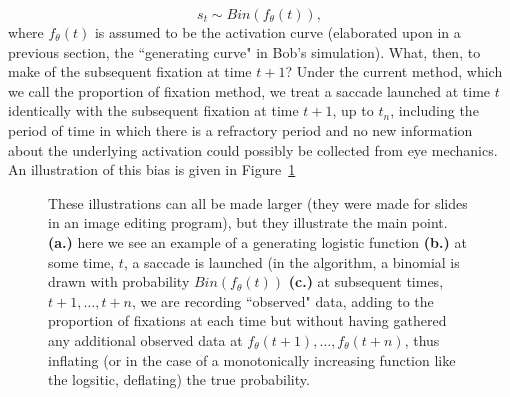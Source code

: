\documentclass{article}
\begin{document}
\begin{equation} \label{eq:saccade_dist}
s_t \sim Bin(f_{\theta}(t)),
\end{equation}
where $f_{\theta}(t)$ is assumed to be the activation curve (elaborated upon in a previous section, the ``generating curve" in Bob's simulation). What, then, to make of the subsequent fixation at time $t+1$? Under the current method, which we call the proportion of fixation method, we treat a saccade launched at time $t$ identically with the subsequent fixation at time $t+1$, up to $t_n$, including the period of time in which there is a refractory period and no new information about the underlying activation could possibly be collected from eye mechanics. An illustration of this bias is given in Figure~\ref{fig:folly_of_fixation}

\begin{figure}[H]
    \centering
    \caption{These illustrations can all be made larger (they were made for slides in an image editing program), but they illustrate the main point. \textbf{(a.)} here we see an example of a generating logistic function \textbf{(b.)} at some time, $t$, a saccade is launched (in the algorithm, a binomial is drawn with probability $Bin(f_{\theta}(t))$ \textbf{(c.)} at subsequent times, $t+1, \dots, t+n$, we are recording ``observed" data, adding to the proportion of fixations at each time but without having gathered any additional observed data at $f_{\theta}(t+1), \dots,f_{\theta}(t+n)$, thus inflating (or in the case of a monotonically increasing function like the logsitic, deflating) the true probability. }
\label{fig:folly_of_fixation}
\end{figure}
\end{document}
